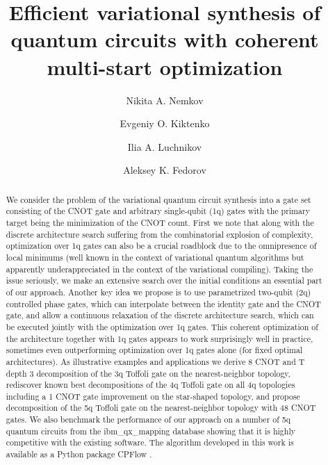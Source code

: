 \documentclass[twocolumn, amsfonts, amssymb, aps, nofootinbib]{revtex4-2}
\newcommand{\CX}{\textsf{CNOT }}
\newcommand{\T}{\textsf{T }}
\newcommand{\package}[1]{\textrm {#1 }}
\newcommand{\cpflow}{\package{CPFlow}}
\begin{document}
\title{Efficient variational synthesis of quantum circuits with coherent multi-start optimization}

\author{Nikita A. Nemkov}
\author{Evgeniy O. Kiktenko}
\author{Ilia A. Luchnikov}
\author{Aleksey K. Fedorov}

\begin{abstract}
We consider the problem of the variational quantum circuit synthesis into a gate set consisting of the \CX gate and arbitrary single-qubit (1q) gates with the primary target being the minimization of the \CX count. First we note that along with the discrete architecture search suffering from the combinatorial explosion of complexity, optimization over 1q gates can also be a crucial roadblock due to the omnipresence of local minimums (well known in the context of variational quantum algorithms but apparently underappreciated in the context of the variational compiling). Taking the issue seriously, we make an extensive search over the initial conditions an essential part of our approach.
Another key idea we propose is to use parametrized two-qubit (2q) controlled phase gates, which can interpolate between the identity gate and the \CX gate, and allow a continuous relaxation of the discrete architecture search, which can be executed jointly with the optimization over 1q gates. This coherent optimization of the architecture together with 1q gates appears to work surprisingly well in practice, sometimes even outperforming optimization over 1q gates alone (for fixed optimal architectures).
As illustrative examples and applications we derive 8 \CX and \T depth 3 decomposition of the 3q Toffoli gate on the nearest-neighbor topology, rediscover known best decompositions of the 4q Toffoli gate on all 4q topologies including a  1 \CX gate improvement on the star-shaped topology, and propose decomposition of the 5q Toffoli gate on the nearest-neighbor topology with 48 \CX gates. We also benchmark the performance of our approach on a number of 5q quantum circuits from the ibm\_qx\_mapping database showing that it is highly competitive with the existing software. The algorithm developed in this work is available as a Python package \cpflow.
\end{abstract}
\end{document}
